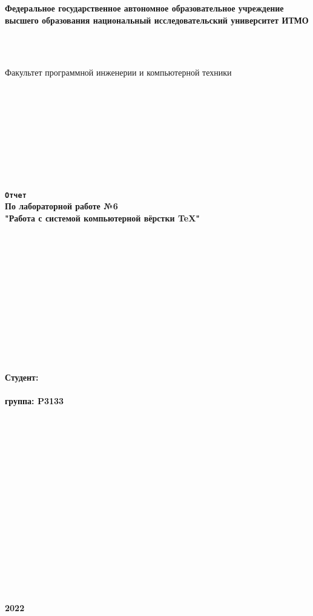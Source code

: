 \documentclass{article}
\begin{document}
\begin{center}
\textbf{\Large{Федеральное государственное автономное образовательное учреждение высшего образования национальный исследовательский 
университет ИТМО}}
\end{center} \textbf{\\ \\}
\begin{center}
\Large{Факультет программной инженерии и компьютерной техники}
\end{center}
\textbf{\\ \\ \\ \\ \\ \\ \\ \\}

\begin{center}
\LARGE\textbf{\texttt{Отчет} \\
По лабораторной работе №6 \\
"Работа с системой компьютерной вёрстки \TeX"
}
\end{center}
\textbf{\\ \\ \\ \\ \\ \\ \\ \\ \\ \\ \\}

\begin{flushright}
\LARGE\textbf{Студент:}\\
\LARGE{}\\
\LARGE\textbf{группа: P3133}\\
\end{flushright}
\textbf{\\ \\ \\ \\ \\ \\ \\ \\ \\ \\ \\ \\ \\ \\ }

\begin{center}
    \Large{} \\
    \Large\textbf{2022}
\end{center}
\end{document}
